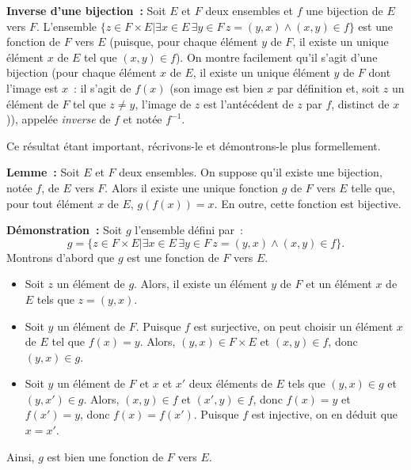 \noindent\textbf{Inverse d'une bijection :} Soit $E$ et $F$ deux ensembles et $f$ une bijection de $E$ vers $F$. 
    L'ensemble $\lbrace z \in F \times E \vert \exists x \in E \, \exists y \in F \, z = (y,x) \wedge (x,y) \in f \rbrace$ est une fonction de $F$ vers $E$ (puisque, pour chaque élément $y$ de $F$, il existe un unique élément $x$ de $E$ tel que $(x,y) \in f$). On montre facilement qu'il s'agit d'une bijection (pour chaque élément $x$ de $E$, il existe un unique élément $y$ de $F$ dont l'image est $x$ : il s'agit de $f(x)$ (son image est bien $x$ par définition et, soit $z$ un élément de $F$ tel que $z \neq y$, l'image de $z$ est l'antécédent de $z$ par $f$, distinct de $x$)), appelée \textit{inverse} de $f$ et notée $f^{-1}$.  

Ce résultat étant important, récrivons-le et démontrons-le plus formellement. 

\medskip

\noindent\textbf{Lemme :} Soit $E$ et $F$ deux ensembles. On suppose qu'il existe une bijection, notée $f$, de $E$ vers $F$. Alors il existe une unique fonction $g$ de $F$ vers $E$ telle que, pour tout élément $x$ de $E$, $g(f(x)) = x$. 
En outre, cette fonction est bijective. 

\medskip

\noindent\textbf{Démonstration :}
    Soit $g$ l'ensemble défini par : 
    \begin{equation*}
        g = \lbrace z \in F \times E \vert \exists x \in E \, \exists y \in F \, z = (y,x) \wedge (x,y) \in f \rbrace.
    \end{equation*}
    Montrons d'abord que $g$ est une fonction de $F$ vers $E$. 
    \begin{itemize}[nosep]
        \item Soit $z$ un élément de $g$. Alors, il existe un élément $y$ de $F$ et un élément $x$ de $E$ tels que $z = (y,x)$.
        \item Soit $y$ un élément de $F$. Puisque $f$ est surjective, on peut choisir un élément $x$ de $E$ tel que $f(x) = y$. 
            Alors, $(y,x) \in F \times E$ et $(x,y) \in f$, donc $(y,x) \in g$. 
        \item Soit $y$ un élément de $F$ et $x$ et $x'$ deux éléments de $E$ tels que $(y,x) \in g$ et $(y,x') \in g$.
            Alors, $(x,y) \in f$ et $(x',y) \in f$, donc $f(x) = y$ et $f(x') = y$, donc $f(x) = f(x')$.
            Puisque $f$ est injective, on en déduit que $x = x'$.
    \end{itemize}
    Ainsi, $g$ est bien une fonction de $F$ vers $E$.

